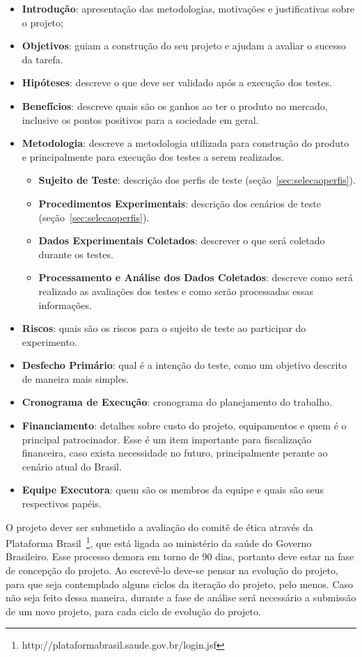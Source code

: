 \begin{itemize}
	\item \textbf{Introdução}: apresentação das metodologias, motivações e justificativas sobre o projeto;
	\item \textbf{Objetivos}: guiam a construção do seu projeto e ajudam a avaliar o sucesso da tarefa.
	\item \textbf{Hipóteses}: descreve o que deve ser validado após a execução dos testes.
	\item \textbf{Benefícios}: descreve quais são os ganhos ao ter o produto no mercado, inclusive os pontos positivos para a sociedade em geral.
	\item \textbf{Metodologia}: descreve a metodologia utilizada para construção do produto e principalmente para execução dos testes a serem realizados.
	\begin{itemize}
		\item \textbf{Sujeito de Teste}: descrição dos perfis de teste (seção~\ref{sec:selecaoperfis}).
		\item \textbf{Procedimentos Experimentais}: descrição dos cenários de teste (seção~\ref{sec:selecaoperfis}).
		\item \textbf{Dados Experimentais Coletados}: descrever o que será coletado durante os testes.
		\item \textbf{Processamento e Análise dos Dados Coletados}: descreve como será realizado as avaliações dos testes e como serão processadas essas informações.
	\end{itemize}
	\item \textbf{Riscos}: quais são os riscos para o sujeito de teste ao participar do experimento.
	\item \textbf{Desfecho Primário}: qual é a intenção do teste, como um objetivo descrito de maneira mais simples.
	\item \textbf{Cronograma de Execução}: cronograma do planejamento do trabalho.
	\item \textbf{Financiamento}: detalhes sobre custo do projeto, equipamentos e quem é o principal patrocinador. Esse é um item importante para fiscalização financeira, caso exista necessidade no futuro, principalmente perante ao cenário atual do Brasil.
	\item \textbf{Equipe Executora}: quem são os membros da equipe e quais são seus respectivos papéis.
\end{itemize}

O projeto dever ser submetido a avaliação do comitê de ética através da Plataforma Brasil~\footnote{http://plataformabrasil.saude.gov.br/login.jsf}, que está ligada ao ministério da saúde do Governo Brasileiro. Esse processo demora em torno de 90 dias, portanto deve estar na fase de concepção do projeto. Ao escrevê-lo deve-se pensar na evolução do projeto, para que seja contemplado alguns ciclos da iteração do projeto, pelo menos. Caso não seja feito dessa maneira, durante a fase de análise será necessário a submissão de um novo projeto, para cada ciclo de evolução do projeto.

